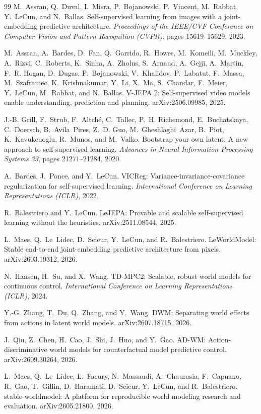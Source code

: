 \begin{thebibliography}{99}
 M.~Assran, Q.~Duval, I.~Misra, P.~Bojanowski, P.~Vincent, M.~Rabbat, Y.~LeCun, and N.~Ballas. Self-supervised learning from images with a joint-embedding predictive architecture. \emph{Proceedings of the IEEE/CVF Conference on Computer Vision and Pattern Recognition (CVPR)}, pages 15619--15629, 2023.

 M.~Assran, A.~Bardes, D.~Fan, Q.~Garrido, R.~Howes, M.~Komeili, M.~Muckley, A.~Rizvi, C.~Roberts, K.~Sinha, A.~Zholus, S.~Arnaud, A.~Gejji, A.~Martin, F.~R. Hogan, D.~Dugas, P.~Bojanowski, V.~Khalidov, P.~Labatut, F.~Massa, M.~Szafraniec, K.~Krishnakumar, Y.~Li, X.~Ma, S.~Chandar, F.~Meier, Y.~LeCun, M.~Rabbat, and N.~Ballas. V-JEPA 2: Self-supervised video models enable understanding, prediction and planning. arXiv:2506.09985, 2025.

 J.-B. Grill, F.~Strub, F.~Altch\'e, C.~Tallec, P.~H. Richemond, E.~Buchatskaya, C.~Doersch, B.~Avila~Pires, Z.~D. Guo, M.~Gheshlaghi~Azar, B.~Piot, K.~Kavukcuoglu, R.~Munos, and M.~Valko. Bootstrap your own latent: A new approach to self-supervised learning. \emph{Advances in Neural Information Processing Systems 33}, pages 21271--21284, 2020.

 A.~Bardes, J.~Ponce, and Y.~LeCun. VICReg: Variance-invariance-covariance regularization for self-supervised learning. \emph{International Conference on Learning Representations (ICLR)}, 2022.

 R.~Balestriero and Y.~LeCun. LeJEPA: Provable and scalable self-supervised learning without the heuristics. arXiv:2511.08544, 2025.

 L.~Maes, Q.~Le~Lidec, D.~Scieur, Y.~LeCun, and R.~Balestriero. LeWorldModel: Stable end-to-end joint-embedding predictive architecture from pixels. arXiv:2603.19312, 2026.

 N.~Hansen, H.~Su, and X.~Wang. TD-MPC2: Scalable, robust world models for continuous control. \emph{International Conference on Learning Representations (ICLR)}, 2024.

 Y.-G. Zhang, T.~Du, Q.~Zhang, and Y.~Wang. DWM: Separating world effects from actions in latent world models. arXiv:2607.18715, 2026.

 J.~Qiu, Z.~Chen, H.~Cao, J.~Shi, J.~Huo, and Y.~Gao. AD-WM: Action-discriminative world models for counterfactual model predictive control. arXiv:2609.30264, 2026.

 L.~Maes, Q.~Le~Lidec, L.~Facury, N.~Massaudi, A.~Chaurasia, F.~Capuano, R.~Gao, T.~Gillin, D.~Haramati, D.~Scieur, Y.~LeCun, and R.~Balestriero. stable-worldmodel: A platform for reproducible world modeling research and evaluation. arXiv:2605.21800, 2026.


\end{thebibliography}
